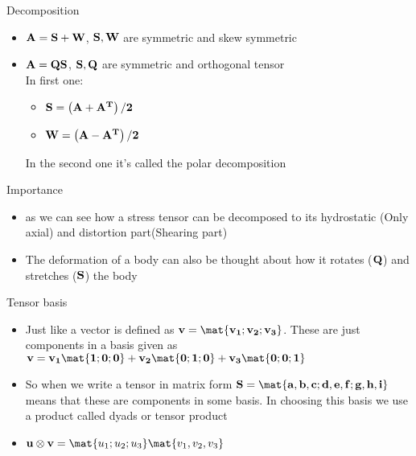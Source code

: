 	\begin{frame}{Decomposition}
		\begin{itemize}
			\item $\mathbf{A = S + W }$, $\mathbf{S,W}$ are symmetric and skew symmetric
			\item $\mathbf{A = QS }$, $\mathbf{S,Q}$ are symmetric and orthogonal tensor\\
			
			In first one:
			\begin{itemize}
				\item $\mathbf{S = \left(A+A^T \right)/2}$
				\item   $\mathbf{W =  \left(A-A^T \right)/2}$				
			\end{itemize}
			
			In the second one it's called the polar decomposition
		\end{itemize}
	
		\begin{block}{Importance}
			\begin{itemize}
				\item  as we can see how a stress tensor can be decomposed to its hydrostatic (Only axial) and distortion part(Shearing part)
				\item The deformation of a body can also be thought about how it rotates ($\mathbf{Q}$) and stretches ($\mathbf{S}$) the body
				
			\end{itemize}
		\end{block}
	\end{frame}


	\begin{frame}{Tensor basis}
		\begin{itemize}
			\item  Just  like a vector is defined as $\ve{v = \mat{v_1;v_2;v_3}}$. These are just components in a basis given as $\ve{v = v_1\mat{1;0;0}+v_2\mat{0;1;0}+v_3\mat{0;0;1}}$
			\item So when we write a tensor in matrix form $\ve{S = \mat{a,b,c;d,e,f;g,h,i}}$ means that these are components in some basis. In choosing this basis we use a product called dyads or tensor product
			\item $\ve{u \otimes v} = \mat{u_1;u_2;u_3}\mat{v_1,v_2,v_3}$
		\end{itemize}
	\end{frame}

	\begin{frame}
		
	\end{frame}
